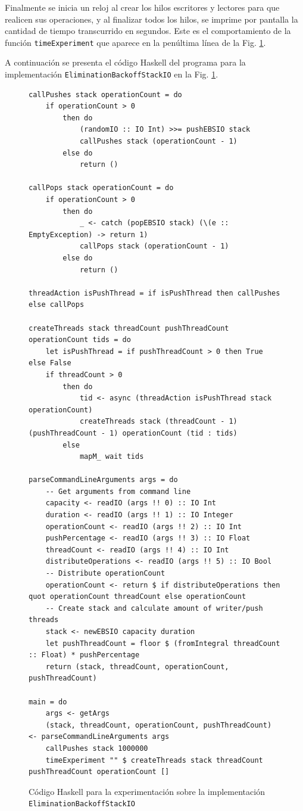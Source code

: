 Finalmente se inicia un reloj al crear los hilos escritores y lectores para que realicen sus operaciones, y al finalizar todos los hilos, se imprime por pantalla la cantidad de tiempo transcurrido en segundos. Este es el comportamiento de la función \texttt{timeExperiment} que aparece en la penúltima línea de la Fig. \ref{fig:expEBSIO}.

A continuación se presenta el código Haskell del programa para la implementación \texttt{EliminationBackoffStackIO} en la Fig. \ref{fig:expEBSIO}.

\begin{figure}[H]
    \centering
    \begin{verbatim}
callPushes stack operationCount = do
    if operationCount > 0
        then do
            (randomIO :: IO Int) >>= pushEBSIO stack
            callPushes stack (operationCount - 1)
        else do
            return ()

callPops stack operationCount = do
    if operationCount > 0
        then do
            _ <- catch (popEBSIO stack) (\(e :: EmptyException) -> return 1)
            callPops stack (operationCount - 1)
        else do
            return ()

threadAction isPushThread = if isPushThread then callPushes else callPops

createThreads stack threadCount pushThreadCount operationCount tids = do
    let isPushThread = if pushThreadCount > 0 then True else False
    if threadCount > 0
        then do
            tid <- async (threadAction isPushThread stack operationCount)
            createThreads stack (threadCount - 1) (pushThreadCount - 1) operationCount (tid : tids)
        else
            mapM_ wait tids

parseCommandLineArguments args = do
    -- Get arguments from command line
    capacity <- readIO (args !! 0) :: IO Int
    duration <- readIO (args !! 1) :: IO Integer
    operationCount <- readIO (args !! 2) :: IO Int
    pushPercentage <- readIO (args !! 3) :: IO Float
    threadCount <- readIO (args !! 4) :: IO Int
    distributeOperations <- readIO (args !! 5) :: IO Bool
    -- Distribute operationCount
    operationCount <- return $ if distributeOperations then quot operationCount threadCount else operationCount
    -- Create stack and calculate amount of writer/push threads
    stack <- newEBSIO capacity duration
    let pushThreadCount = floor $ (fromIntegral threadCount :: Float) * pushPercentage
    return (stack, threadCount, operationCount, pushThreadCount)

main = do
    args <- getArgs
    (stack, threadCount, operationCount, pushThreadCount) <- parseCommandLineArguments args
    callPushes stack 1000000
    timeExperiment "" $ createThreads stack threadCount pushThreadCount operationCount []
    \end{verbatim}
    \caption{Código Haskell para la experimentación sobre la implementación \texttt{EliminationBackoffStackIO}}
    \label{fig:expEBSIO}
\end{figure}

